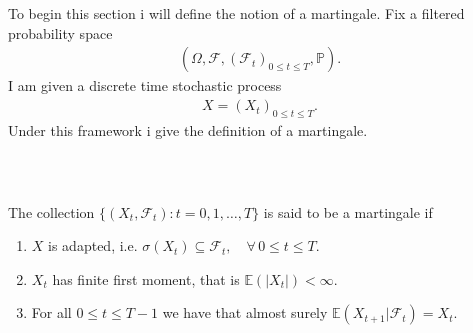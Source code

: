 \documentclass{beamer}
\numberwithin{equation}{section}
\begin{document}
\begin{frame}\frametitle{{\normalsize \secname} \\ {\large \subsecname}}
    To begin this section i will define the notion of a martingale.
    Fix a filtered probability space
    \begin{align}
        \left(
            \Omega, 
            \mathscr{F}, 
            \left(
                \mathscr{F}_t
            \right)_{0 \leq t \leq T},
            \mathbb{P}
        \right).
    \end{align}
    I am given a discrete time stochastic process
    \begin{align}
        X = (X_t)_{0 \leq t \leq T}. 
    \end{align}
    Under this framework i give the definition of a martingale.
\end{frame}

\begin{frame}\frametitle{{\normalsize \secname} \\ {\large \subsecname}}
    \begin{definition}[Martingale]\label{def:martingale}
        The collection $\{ (X_t, \mathscr{F}_t): t = 0,1, \ldots, T \}$ is said to be a martingale if
        \begin{enumerate}
            \item $X$ is adapted, i.e. $\sigma(X_t) \subseteq \mathscr{F}_t, \quad \forall \, 0 \leq t \leq T$.
            \item $X_t$ has finite first moment, that is $\mathbb{E}(|X_t|) < \infty$. 
            \item For all $0 \leq t \leq T-1$ we have that almost surely $\mathbb{E}(X_{t + 1} | \mathscr{F}_t) = X_t$. 
        \end{enumerate}
    \end{definition}
\end{frame}
\end{document}
